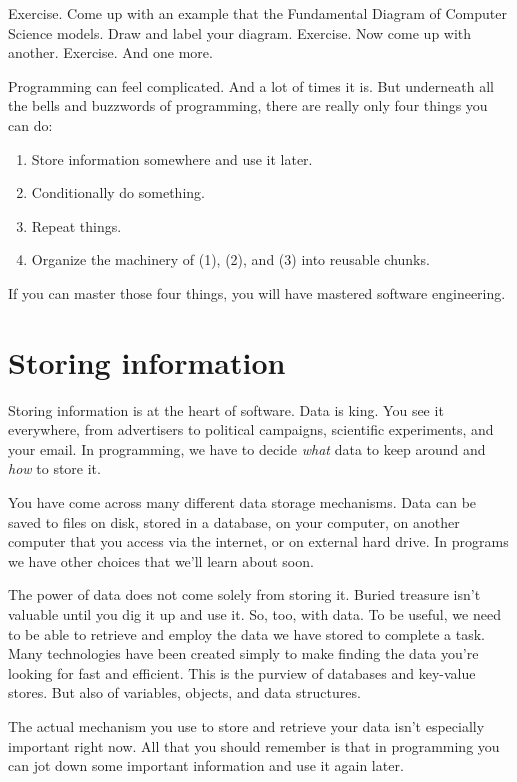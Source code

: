 Exercise. Come up with an example that the Fundamental Diagram of Computer Science models. Draw and label your diagram.
Exercise. Now come up with another.
Exercise. And one more.


Programming can feel complicated. And a lot of times it is. But underneath all the bells and buzzwords of programming, there are really only four things you can do:

\begin{enumerate}
  \item Store information somewhere and use it later.
  \item Conditionally do something.
  \item Repeat things.
  \item Organize the machinery of (1), (2), and (3) into reusable chunks.
\end{enumerate}

If you can master those four things, you will have mastered software engineering.

\section{Storing information}
Storing information is at the heart of software. Data is king. You see it everywhere, from advertisers to political campaigns, scientific experiments, and your email. In programming, we have to decide \textit{what} data to keep around and \textit{how} to store it.

You have come across many different data storage mechanisms. Data can be saved to files on disk, stored in a database, on your computer, on another computer that you access via the internet, or on external hard drive. In programs we have other choices that we'll learn about soon.

The power of data does not come solely from storing it. Buried treasure isn't valuable until you dig it up and use it. So, too, with data. To be useful, we need to be able to retrieve and employ the data we have stored to complete a task. Many technologies have been created simply to make finding the data you're looking for fast and efficient. This is the purview of databases and key-value stores. But also of variables, objects, and data structures.

The actual mechanism you use to store and retrieve your data isn't especially important right now. All that you should remember is that in programming you can jot down some important information and use it again later.

